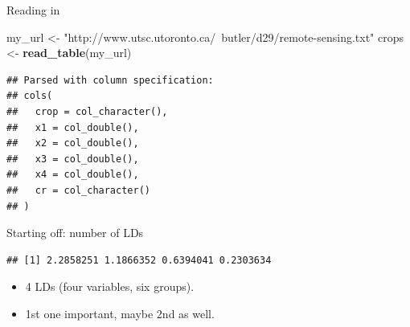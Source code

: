 \documentclass[ignorenonframetext,]{beamer}
\newenvironment{Shaded}{\begin{snugshade}}{\end{snugshade}}
\newcommand{\DataTypeTok}[1]{\textcolor[rgb]{0.13,0.29,0.53}{#1}}
\newcommand{\KeywordTok}[1]{\textcolor[rgb]{0.13,0.29,0.53}{\textbf{#1}}}
\newcommand{\NormalTok}[1]{#1}
\newcommand{\OperatorTok}[1]{\textcolor[rgb]{0.81,0.36,0.00}{\textbf{#1}}}
\newcommand{\StringTok}[1]{\textcolor[rgb]{0.31,0.60,0.02}{#1}}
\begin{document}
\begin{frame}[fragile]{Reading in}
\protect\hypertarget{reading-in-1}{}

\small

\begin{Shaded}
\begin{Highlighting}[]
\NormalTok{my_url <-}\StringTok{ }
\StringTok{   "http://www.utsc.utoronto.ca/~butler/d29/remote-sensing.txt"}
\NormalTok{crops <-}\StringTok{ }\KeywordTok{read_table}\NormalTok{(my_url)}
\end{Highlighting}
\end{Shaded}

\begin{verbatim}
## Parsed with column specification:
## cols(
##   crop = col_character(),
##   x1 = col_double(),
##   x2 = col_double(),
##   x3 = col_double(),
##   x4 = col_double(),
##   cr = col_character()
## )
\end{verbatim}

\normalsize

\end{frame}

\begin{frame}[fragile]{Starting off: number of LDs}
\protect\hypertarget{starting-off-number-of-lds}{}

\begin{Shaded}
\end{Shaded}

\begin{verbatim}
## [1] 2.2858251 1.1866352 0.6394041 0.2303634
\end{verbatim}

\begin{itemize}
\item
  4 LDs (four variables, six groups).
\item
  1st one important, maybe 2nd as well.
\end{itemize}

\end{frame}
\end{document}
